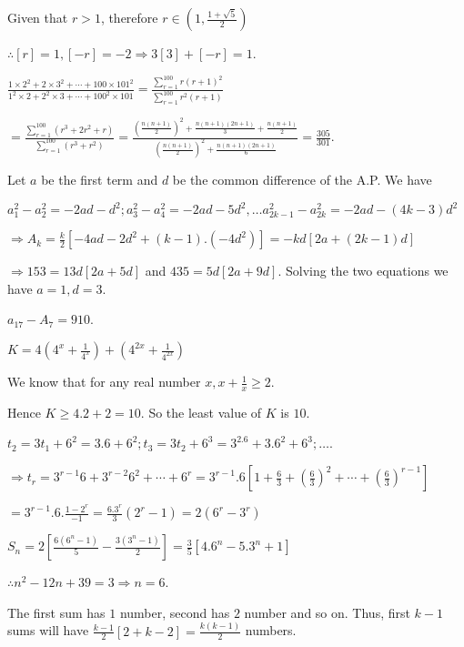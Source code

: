   Given that $r > 1$, therefore $r\in\left(1, \frac{1 + \sqrt{5}}{2}\right)$

  $\therefore [r] = 1, [-r] = -2\Rightarrow 3[3] + [-r] = 1$.
\item $\frac{1\times2^2 + 2\times3^2 + \cdots + 100\times101^2}{1^2\times2 + 2^2\times3 + \cdots +
  100^2\times101} = \displaystyle\frac{\sum_{r = 1}^{100}r(r + 1)^2}{\sum_{r = 1}^{100}r^2(r + 1)}$

  $= \displaystyle\frac{\sum_{r = 1}^{100}(r^3 + 2r^2 + r)}{\sum_{r = 1}^{100}(r^3 + r^2)} =
  \frac{\left(\frac{n(n+ 1)}{2}\right)^2 + \frac{n(n + 1)(2n + 1)}{3} + \frac{n(n + 1)}{2}}{\left(\frac{n(n
      + 1)}{2}\right)^2 + \frac{n(n + 1)(2n+ 1)}{6}} = \frac{305}{301}$.
\item Let $a$ be the first term and $d$ be the common difference of the A.P. We have

  $a_1^2 - a_2^2 = -2ad - d^2; a_3^2 - a_4^2 = -2ad - 5d^2, \ldots a_{2k - 1}^2 - a_{2k}^2 = -2ad - (4k -
  3)d^2$

  $\Rightarrow A_k = \frac{k}{2}[-4ad - 2d^2 + (k - 1).(-4d^2)] = -kd[2a + (2k - 1)d]$

  $\Rightarrow 153 = 13d[2a + 5d]$ and $435 = 5d[2a + 9d]$. Solving the two equations we have $a = 1, d =
  3$.

  $a_{17} - A_7 = 910$.
\item $K = 4\left(4^x + \frac{1}{4^x}\right) + \left(4^{2x} + \frac{1}{4^{2x}}\right)$

  We know that for any real number $x, x + \frac{1}{x}\geq 2$.

  Hence $K \geq 4.2 + 2 = 10$. So the least value of $K$ is $10$.
\item $t_2 = 3t_1 + 6^2 = 3.6 + 6^2; t_3 = 3t_2 + 6^3 = 3^2.6 + 3.6^2 + 6^3; \ldots$.

  $\Rightarrow t_r = 3^{r - 1}6 + 3^{r - 2}6^2 + \cdots + 6^r = 3^{r - 1}.6\left[1 + \frac{6}{3} +
  \left(\frac{6}{3}\right)^2 + \cdots + \left(\frac{6}{3}\right)^{r - 1}\right]$

  $= 3^{r - 1}.6.\frac{1 - 2^r}{-1} = \frac{6.3^r}{3}(2^r - 1) = 2(6^r - 3^r)$

  $S_n = 2\left[\frac{6(6^n - 1)}{5} - \frac{3(3^n - 1)}{2}\right] = \frac{3}{5}[4.6^n - 5.3^n + 1]$

  $\therefore n^2 - 12n + 39 = 3\Rightarrow n = 6$.
\item The first sum has $1$ number, second has $2$ number and so on. Thus, first $k - 1$ sums will have
  $\frac{k - 1}{2}[2 + k - 2] = \frac{k(k - 1)}{2}$ numbers.

